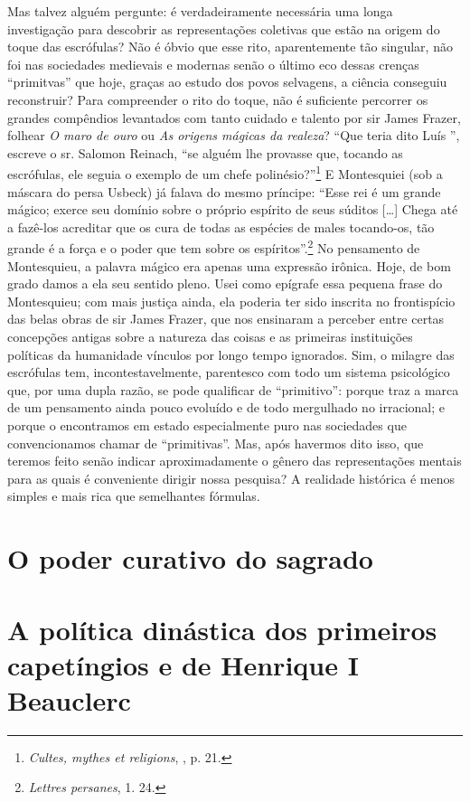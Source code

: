 Mas talvez alguém pergunte: é verdadeiramente necessária uma longa investigação para descobrir as representações coletivas que estão na origem do toque das escrófulas? Não é óbvio que esse rito, aparentemente tão singular, não foi nas sociedades medievais e modernas senão o último eco dessas crenças ``primitvas'' que hoje, graças ao estudo dos povos selvagens, a ciência conseguiu reconstruir? Para compreender o rito do toque, não é suficiente percorrer os grandes compêndios levantados com tanto cuidado e talento por sir James Frazer, folhear \emph{O maro de ouro} ou \emph{As origens mágicas da realeza}? ``Que teria dito Luís '', escreve o sr. Salomon Reinach, ``se alguém lhe provasse que, tocando as escrófulas, ele seguia o exemplo de um chefe polinésio?''\footnote{\emph{Cultes, mythes et religions}, , p. 21.} E Montesquiei (sob a máscara do persa Usbeck) já falava do mesmo príncipe: ``Esse rei é um grande mágico; exerce seu domínio sobre o próprio espírito de seus súditos [\ldots] Chega até a fazê-los acreditar que os cura de todas as espécies de males tocando-os, tão grande é a força e o poder que tem sobre os espíritos''.\footnote{\emph{Lettres persanes}, 1. 24.} No pensamento de Montesquieu, a palavra mágico era apenas uma expressão irônica. Hoje, de bom grado damos a ela seu sentido pleno. Usei como epígrafe essa pequena frase do Montesquieu; com mais justiça ainda, ela poderia ter sido inscrita no frontispício das belas obras de sir James Frazer, que nos ensinaram a perceber entre certas concepções antigas sobre a natureza das coisas e as primeiras instituições políticas da humanidade vínculos por longo tempo ignorados. Sim, o milagre das escrófulas tem, incontestavelmente, parentesco com todo um sistema psicológico que, por uma dupla razão, se pode qualificar de ``primitivo'': porque traz a marca de um pensamento ainda pouco evoluído e de todo mergulhado no irracional; e porque o encontramos em estado especialmente puro nas sociedades que convencionamos chamar de ``primitivas''. Mas, após havermos dito isso, que teremos feito senão indicar aproximadamente o gênero das representações mentais para as quais é conveniente dirigir nossa pesquisa? A realidade histórica é menos simples e mais rica que semelhantes fórmulas.
\section{O poder curativo do sagrado}

\section{A política dinástica dos primeiros capetíngios e de Henrique I Beauclerc}
